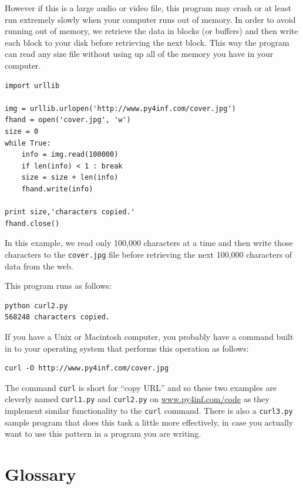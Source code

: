 However if this is a large audio or video file, this program may crash
or at least run extremely slowly when your computer runs out of memory.
In order to avoid running out of memory, we retrieve the data in blocks
(or buffers) and then write each block to your disk before retrieving
the next block.  This way the program can read any size file without
using up all of the memory you have in your computer.

\beforeverb
\begin{verbatim}
import urllib

img = urllib.urlopen('http://www.py4inf.com/cover.jpg')
fhand = open('cover.jpg', 'w')
size = 0
while True:
    info = img.read(100000)
    if len(info) < 1 : break
    size = size + len(info)
    fhand.write(info)

print size,'characters copied.'
fhand.close()
\end{verbatim}
\afterverb
%
In this example, we read only 100,000 characters at a time and then 
write those characters to the {\tt cover.jpg} file
before retrieving the next 100,000 characters of data from the
web.

This program runs as follows:

\beforeverb
\begin{verbatim}
python curl2.py 
568248 characters copied.
\end{verbatim}
\afterverb
%

If you have a Unix or Macintosh computer, you probably have a command
built in to your operating system that performs this operation
as follows:

\beforeverb
\begin{verbatim}
curl -O http://www.py4inf.com/cover.jpg
\end{verbatim}
\afterverb
%
The command {\tt curl} is short for ``copy URL'' and so these two 
examples are cleverly named {\tt curl1.py} and {\tt curl2.py} on 
\url{www.py4inf.com/code} as they implement similar functionality
to the {\tt curl} command.  There is also a {\tt curl3.py} sample 
program that does this task a little more effectively, in case you
actually want to use this pattern in a program you are writing.

\section{Glossary}


